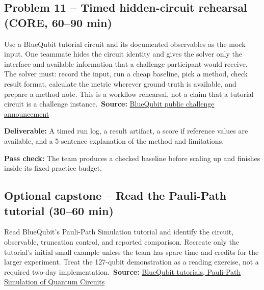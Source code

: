 \documentclass[11pt,letterpaper]{article}
\newcommand{\taskbox}[1]{\vspace{2pt}\noindent\colorbox{pale}{\parbox{\dimexpr\linewidth-2\fboxsep}{\textcolor{ink}{\textbf{Deliverable:} #1}}}\vspace{3pt}}
\newcommand{\pass}[1]{\textbf{Pass check:} #1}
\newcommand{\source}[2]{\textbf{Source:} \href{#1}{#2}}
\begin{document}
\subsection*{Problem 11 -- Timed hidden-circuit rehearsal (CORE, 60--90 min)}
Use a BlueQubit tutorial circuit and its documented observables as the mock input. One teammate hides the circuit identity and gives the solver only the interface and available information that a challenge participant would receive. The solver must: record the input, run a cheap baseline, pick a method, check result format, calculate the metric wherever ground truth is available, and prepare a method note. This is a workflow rehearsal, not a claim that a tutorial circuit is a challenge instance.\
\source{https://qa.linkedin.com/company/bluequbit}{BlueQubit public challenge announcement}
\taskbox{A timed run log, a result artifact, a score if reference values are available, and a 5-sentence explanation of the method and limitations.}
\pass{The team produces a checked baseline before scaling up and finishes inside its fixed practice budget.}

\subsection*{Optional capstone -- Read the Pauli-Path tutorial (30--60 min)}
Read BlueQubit's Pauli-Path Simulation tutorial and identify the circuit, observable, truncation control, and reported comparison. Recreate only the tutorial's initial small example unless the team has spare time and credits for the larger experiment. Treat the 127-qubit demonstration as a reading exercise, not a required two-day implementation.\
\source{https://app.bluequbit.io/tutorials}{BlueQubit tutorials, Pauli-Path Simulation of Quantum Circuits}
\end{document}
